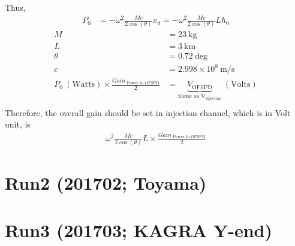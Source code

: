 Thus,
\begin{align}
    P_0 &= -\omega^2 \frac{M c}{2 \cos(\theta)} x_0 = -\omega^2 \frac{M c}{2 \cos(\theta)} L h_0
\end{align}
\begin{align*}
    M &= 23 ~\mathrm{kg} \\
    L &= 3 ~\mathrm{km}  \\
    \theta &= 0.72 ~\mathrm{deg}  \\
    c &= 2.998\times10^8 ~\mathrm{m/s} \\
    P_0 ~(\mathrm{Watts}) \times \frac{Gain_{\text{~Power to OFSPD}}}{2} &= 
     \underbrace{V_{\text{OFSPD}}}_{\text{Same as V$_{\text{Injection}}$}}~ (\mathrm{Volts}) \\
\end{align*}
Therefore, the overall gain should be set in injection channel, which is in Volt unit, is
\begin{align}
    \omega^2 \frac{M c}{2 \cos(\theta)} L \times \frac{Gain_{\text{~Power to OFSPD}} }{2}
\end{align}

\pagebreak

\section{Run2 (201702; Toyama)}

\section{Run3 (201703; KAGRA Y-end)}

